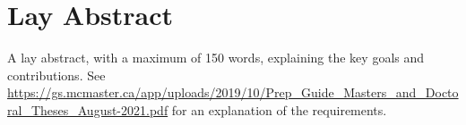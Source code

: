 \chapter{Lay Abstract}
\label{chap:lay_abstract}

A lay abstract, with a maximum of 150 words, explaining the key goals and
contributions. See
\url{https://gs.mcmaster.ca/app/uploads/2019/10/Prep_Guide_Masters_and_Doctoral_Theses_August-2021.pdf}
for an explanation of the requirements.

